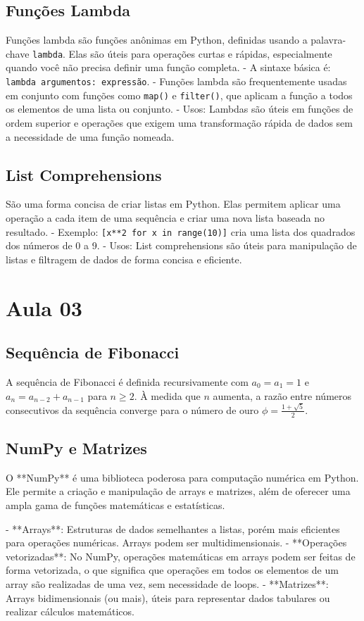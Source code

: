\documentclass{sciposter}
\begin{document}
\begin{multicols}{3}
\subsection{Funções Lambda}
Funções lambda são funções anônimas em Python, definidas usando a palavra-chave \texttt{lambda}. Elas são úteis para operações curtas e rápidas, especialmente quando você não precisa definir uma função completa.
- A sintaxe básica é: \texttt{lambda argumentos: expressão}.
- Funções lambda são frequentemente usadas em conjunto com funções como \texttt{map()} e \texttt{filter()}, que aplicam a função a todos os elementos de uma lista ou conjunto.
- Usos: Lambdas são úteis em funções de ordem superior e operações que exigem uma transformação rápida de dados sem a necessidade de uma função nomeada.

\subsection{List Comprehensions}
São uma forma concisa de criar listas em Python. Elas permitem aplicar uma operação a cada item de uma sequência e criar uma nova lista baseada no resultado.
- Exemplo: \texttt{[x**2 for x in range(10)]} cria uma lista dos quadrados dos números de 0 a 9.
- Usos: List comprehensions são úteis para manipulação de listas e filtragem de dados de forma concisa e eficiente.

\section{Aula 03}

\subsection{Sequência de Fibonacci}
A sequência de Fibonacci é definida recursivamente com \(a_0 = a_1 = 1\) e \(a_n = a_{n-2} + a_{n-1}\) para \(n \geq 2\). À medida que \(n\) aumenta, a razão entre números consecutivos da sequência converge para o número de ouro \(\phi = \frac{1 + \sqrt{5}}{2}\).

\subsection{NumPy e Matrizes}
O **NumPy** é uma biblioteca poderosa para computação numérica em Python. Ele permite a criação e manipulação de arrays e matrizes, além de oferecer uma ampla gama de funções matemáticas e estatísticas.

- **Arrays**: Estruturas de dados semelhantes a listas, porém mais eficientes para operações numéricas. Arrays podem ser multidimensionais.
- **Operações vetorizadas**: No NumPy, operações matemáticas em arrays podem ser feitas de forma vetorizada, o que significa que operações em todos os elementos de um array são realizadas de uma vez, sem necessidade de loops.
- **Matrizes**: Arrays bidimensionais (ou mais), úteis para representar dados tabulares ou realizar cálculos matemáticos.


\end{multicols}
\end{document}
